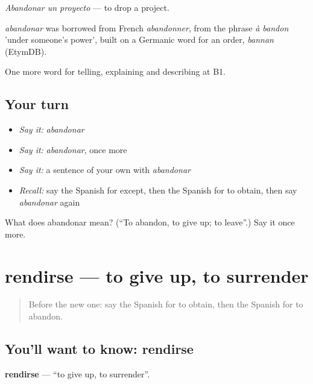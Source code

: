 \emph{Abandonar un proyecto} — to drop a project.

\begin{cousinweb}
\emph{abandonar} was borrowed from French \emph{abandonner}, from the phrase \emph{à bandon} 'under someone's power', built on a Germanic word for an order, \emph{bannan} (EtymDB).
\end{cousinweb}

\begin{grammarlens}[title={What you've built}]
One more word for telling, explaining and describing at B1.
\end{grammarlens}

\subsection*{Your turn}
\begin{itemize}
\raggedright
  \item \emph{Say it:} \emph{abandonar}
  \item \emph{Say it:} \emph{abandonar}, once more
  \item \emph{Say it:} a sentence of your own with \emph{abandonar}
  \item \emph{Recall:} say the Spanish for except, then the Spanish for to obtain, then say \emph{abandonar} again
\end{itemize}

\begin{tcolorbox}[breakable,colback=teal!4,colframe=teal!35!black,title={Before you move on}]
What does abandonar mean? (\textquotedblleft{}To abandon, to give up; to leave\textquotedblright{}.) Say it once more.
\end{tcolorbox}
\section[rendirse]{rendirse — to give up, to surrender}

\label{lesson:ES-C639-rendirse}



\begin{quote}
Before the new one: say the Spanish for to obtain, then the Spanish for to abandon.
\end{quote}

\subsection*{You'll want to know: rendirse}
\textbf{rendirse} — \textquotedblleft{}to give up, to surrender\textquotedblright{}.

